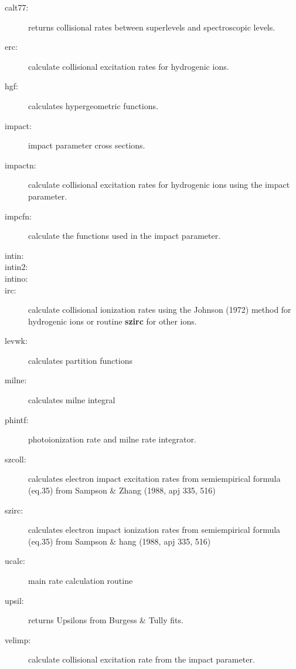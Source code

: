 \begin{description}
\item[calt77:] returns collisional rates between superlevels and
spectroscopic levels.

\item[erc:] calculate collisional excitation rates for hydrogenic ions.

\item[hgf:] calculates hypergeometric functions.

\item[impact:] impact parameter cross sections. 

\item[impactn:] calculate collisional excitation rates for hydrogenic
ions using the impact parameter. 

\item[impcfn:] calculate the functions used in the impact parameter.

\item[intin:] 

\item[intin2:]

\item[intino:]

\item[irc:] calculate collisional ionization rates using the Johnson
(1972) method for hydrogenic ions or routine {\bf szirc} for other 
ions. 

\item[levwk:] calculates partition functions

\item[milne:] calculates milne integral

\item[phintf:] photoionization rate and milne rate integrator.

\item[szcoll:] calculates electron impact excitation rates from semiempirical 
 formula (eq.35) from Sampson $\&$ Zhang (1988, apj 335, 516)

\item[szirc:]  calculates electron impact ionization rates from semiempirical
  formula (eq.35) from Sampson $\&$ hang (1988, apj 335, 516)


\item[ucalc:] main rate calculation routine

\item[upsil:] returns Upsilons from Burgess \& Tully fits.

\item[velimp:] calculate collisional excitation rate from the impact
parameter. 

\end{description}


